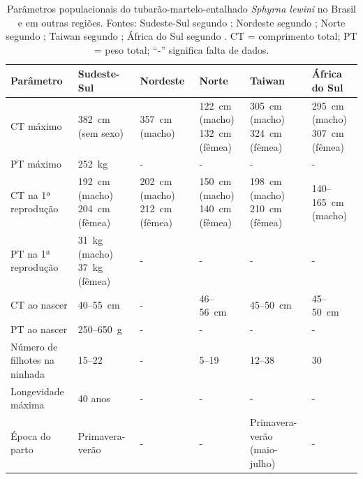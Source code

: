 \documentclass[a4paper,11pt,twoside,showtrims,onecolumn,openright,final]{memoir}
\begin{document}
\begin{table}
\caption[Parâmetros populacionais do tubarão-martelo-entalhado \emph{Sphyrna lewini} no Brasil e em outras regiões]
        {Parâmetros populacionais do tubarão-martelo-entalhado \emph{Sphyrna lewini} no Brasil e em outras regiões. 
         Fontes: Sudeste-Sul segundo \citet{sadowsky1967,kotas2004,galina2005}; 
         Nordeste segundo \citet{hazin2001a}; 
         Norte segundo \citet{lessa1998};
         Taiwan segundo \citet{chen1988}; 
         África do Sul segundo \citet{bass1975}.
         CT = comprimento total; PT = peso total; ``-'' significa falta de dados.}  
\label{tab:lewini-parpopulacional}
\begin{footnotesize}
\begin{tabularx}{\textwidth}{XXXXXX}
\toprule
Parâmetro	& Sudeste-Sul		& Nordeste 		& Norte		& Taiwan	& África do Sul		\\
\midrule
CT máximo	& 382~cm (sem sexo)	& 357~cm (macho)	& 122~cm (macho)
								  132~cm (fêmea)& 305~cm (macho)
										  324~cm (fêmea)& 295~cm (macho)
												  307~cm (fêmea)	\\
\midrule
\addlinespace
PT máximo	& 252~kg		& -			& -		& -		& -			\\
\midrule
\addlinespace
CT na 1ª  
reprodução	& 192~cm (macho)
		  204~cm (fêmea)	& 202~cm (macho)
					  212~cm (fêmea)	& 150~cm (macho)
								  140~cm (fêmea)& 198~cm (macho)
										  210~cm (fêmea)& 140--165~cm (macho)	\\
\midrule
\addlinespace
PT na 1ª  
reprodução	& 31~kg (macho)
		  37~kg (fêmea)		& -			& -		& -		& -			\\
\midrule
\addlinespace
CT ao nascer	& 40--55~cm		& -			& 46--56~cm	& 45--50~cm	& 45--50~cm		\\
\midrule
\addlinespace
PT ao nascer	& 250--650~g		& -			& -		& -		& -			\\
\midrule
\addlinespace
Número de 
filhotes na 
ninhada		& 15--22		& -			& 5--19		& 12--38	& 30			\\
\midrule
\addlinespace
Longevidade 
máxima		& 40 anos		& -			& -		& -		& -			\\
\midrule
\addlinespace
Época do parto	& Primavera-verão	& -			& -		& Primavera-verão 
	 									  (maio-julho)	& -			\\
\bottomrule
\end{tabularx}
\end{footnotesize}
\end{table}

\end{document}
